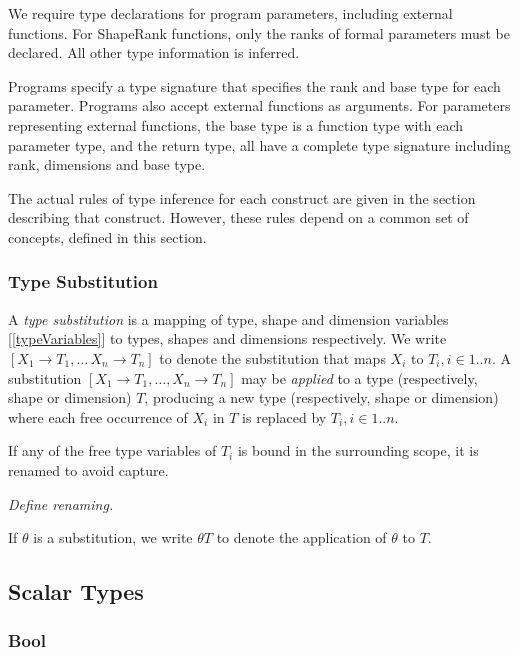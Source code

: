 \documentclass{article}
\begin{document}
{We require type declarations for program parameters, including external functions.
For ShapeRank functions, only the ranks of formal parameters must be declared. All other type information is inferred.

Programs specify a type signature that specifies the rank and base type for each parameter. Programs also accept external functions as arguments.
For parameters representing external functions, the base type is  a function type with each parameter type, and the return type, all have a complete type signature including rank, dimensions and base type.

The actual rules of type inference for each construct are given in the section describing that construct. However, these rules depend on a common set of concepts, defined in this section.
 
  
  \subsubsection{Type Substitution}
  \label{typeSubstitution}
  
  A {\em type substitution} is a mapping of type, shape and dimension variables [\ref{typeVariables}] to types, shapes and dimensions respectively. We write $[X_1 \to T_1, \ldots\, X_n \to T_n]$ to denote the substitution that maps $X_i$ to $T_i, i \in 1..n$. A substitution $[X_1 \to T_1, \ldots, X_n \to T_n]$ may be {\em applied} to a type (respectively, shape or dimension) $T$, producing a new type (respectively, shape or dimension) where each free occurrence of $X_i$ in $T$ is replaced by $T_i ,i \in 1..n$.
  
If any of the free type variables of $T_i$ is bound in the surrounding scope, it is renamed to avoid capture.

{\em Define renaming.}

  
If $\theta$ is a substitution, we write $\theta T$ to denote the application of $\theta$ to $T$.


\subsection{Scalar Types}
\label{scalarTypes}

\subsubsection{Bool}
\label{bool}

}
\end{document}
